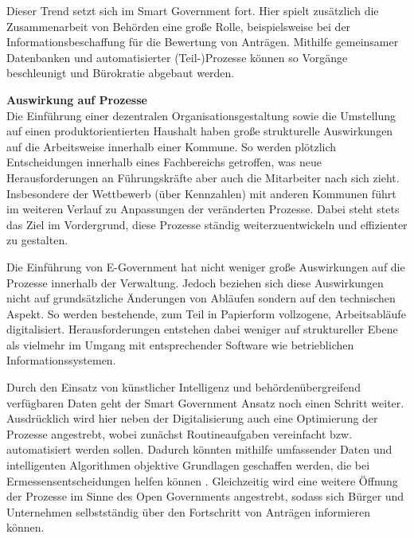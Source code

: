 Dieser Trend setzt sich im Smart Government fort.
Hier spielt zusätzlich die Zusammenarbeit von Behörden eine große Rolle, beispielsweise bei der Informationsbeschaffung für die Bewertung von Anträgen.
Mithilfe gemeinsamer Datenbanken und automatisierter (Teil-)Prozesse können so Vorgänge beschleunigt und Bürokratie abgebaut werden.

\textbf{Auswirkung auf Prozesse}\\
Die Einführung einer dezentralen Organisationsgestaltung sowie die Umstellung auf einen produktorientierten Haushalt haben große strukturelle Auswirkungen auf die Arbeitsweise innerhalb einer Kommune.
So werden plötzlich Entscheidungen innerhalb eines Fachbereichs getroffen, was neue Herausforderungen an Führungskräfte aber auch die Mitarbeiter nach sich zieht.
Insbesondere der Wettbewerb (über Kennzahlen) mit anderen Kommunen führt im weiteren Verlauf zu Anpassungen der veränderten Prozesse.
Dabei steht stets das Ziel im Vordergrund, diese Prozesse ständig weiterzuentwickeln und effizienter zu gestalten.

Die Einführung von E-Government hat nicht weniger große Auswirkungen auf die Prozesse innerhalb der Verwaltung.
Jedoch beziehen sich diese Auswirkungen nicht auf grundsätzliche Änderungen von Abläufen sondern auf den technischen Aspekt.
So werden bestehende, zum Teil in Papierform vollzogene, Arbeitsabläufe digitalisiert.
Herausforderungen entstehen dabei weniger auf struktureller Ebene als vielmehr im Umgang mit entsprechender Software wie betrieblichen Informationssystemen.

Durch den Einsatz von künstlicher Intelligenz und behördenübergreifend verfügbaren Daten geht der Smart Government Ansatz noch einen Schritt weiter.
Ausdrücklich wird hier neben der Digitalisierung auch eine Optimierung der Prozesse angestrebt, wobei zunächst Routineaufgaben vereinfacht bzw. automatisiert werden sollen.
Dadurch könnten mithilfe umfassender Daten und intelligenten Algorithmen objektive Grundlagen geschaffen werden, die bei Ermessensentscheidungen helfen können \citep[][]{Demaj2018}.
Gleichzeitig wird eine weitere Öffnung der Prozesse im Sinne des Open Governments angestrebt, sodass sich Bürger und Unternehmen selbstständig über den Fortschritt von Anträgen informieren können.



